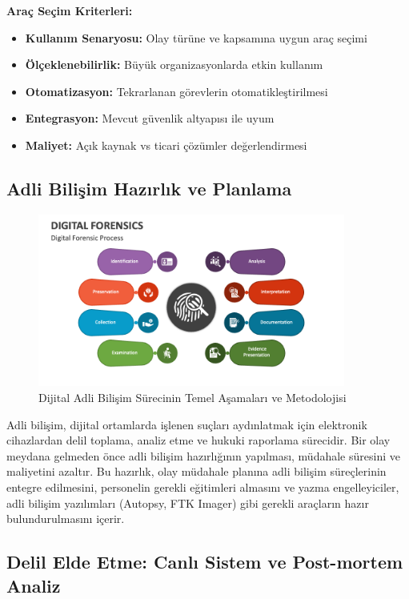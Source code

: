 \begin{itemize}
\begin{itemize}
\textbf{Araç Seçim Kriterleri:}
\begin{itemize}
    \item \textbf{Kullanım Senaryosu:} Olay türüne ve kapsamına uygun araç seçimi
    \item \textbf{Ölçeklenebilirlik:} Büyük organizasyonlarda etkin kullanım
    \item \textbf{Otomatizasyon:} Tekrarlanan görevlerin otomatikleştirilmesi
    \item \textbf{Entegrasyon:} Mevcut güvenlik altyapısı ile uyum
    \item \textbf{Maliyet:} Açık kaynak vs ticari çözümler değerlendirmesi
\end{itemize}

\subsection{Adli Bilişim Hazırlık ve Planlama}

\begin{figure}[H]
    \centering
    \includegraphics[width=0.9\textwidth]{img/digital-forensics-process.png}
    \caption{Dijital Adli Bilişim Sürecinin Temel Aşamaları ve Metodolojisi}
    \label{fig:digital-forensics-process}
\end{figure}

Adli bilişim, dijital ortamlarda işlenen suçları aydınlatmak için elektronik cihazlardan delil toplama, analiz etme ve hukuki raporlama sürecidir. Bir olay meydana gelmeden önce adli bilişim hazırlığının yapılması, müdahale süresini ve maliyetini azaltır. Bu hazırlık, olay müdahale planına adli bilişim süreçlerinin entegre edilmesini, personelin gerekli eğitimleri almasını ve yazma engelleyiciler, adli bilişim yazılımları (Autopsy, FTK Imager) gibi gerekli araçların hazır bulundurulmasını içerir.

\subsection{Delil Elde Etme: Canlı Sistem ve Post-mortem Analiz}


\end{itemize}
\end{itemize}

